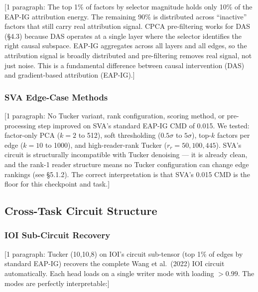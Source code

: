 \documentclass[11pt]{article}
\begin{document}
[1 paragraph: The top 1\% of factors by selector magnitude holds only
10\% of the EAP-IG attribution energy. The remaining 90\% is distributed
across ``inactive'' factors that still carry real attribution signal.
CPCA pre-filtering works for DAS (\S4.3) because DAS operates at a
single layer where the selector identifies the right causal subspace.
EAP-IG aggregates across all layers and all edges, so the attribution
signal is broadly distributed and pre-filtering removes real signal,
not just noise. This is a fundamental difference between causal
intervention (DAS) and gradient-based attribution (EAP-IG).]

\subsubsection{SVA Edge-Case Methods}


[1 paragraph: No Tucker variant, rank configuration, scoring method,
or pre-processing step improved on SVA's standard EAP-IG CMD of 0.015.
We tested: factor-only PCA ($k=2$ to 512), soft thresholding
($0.5\sigma$ to $5\sigma$), top-$k$ factors per edge ($k=10$ to 1000),
and high-reader-rank Tucker ($r_r=50, 100, 445$). SVA's circuit is
structurally incompatible with Tucker denoising --- it is already clean,
and the rank-1 reader structure means no Tucker configuration can change
edge rankings (see \S5.1.2). The correct interpretation is that SVA's
0.015 CMD is the floor for this checkpoint and task.]


\subsection{Cross-Task Circuit Structure}
\label{app:tucker_crosstask}


\subsubsection{IOI Sub-Circuit Recovery}


[1 paragraph: Tucker (10,10,8) on IOI's circuit sub-tensor (top 1\% of
edges by standard EAP-IG) recovers the complete Wang et al.\ (2022)
IOI circuit automatically. Each head loads on a single writer mode
with loading $>0.99$. The modes are perfectly interpretable:]
\end{document}
